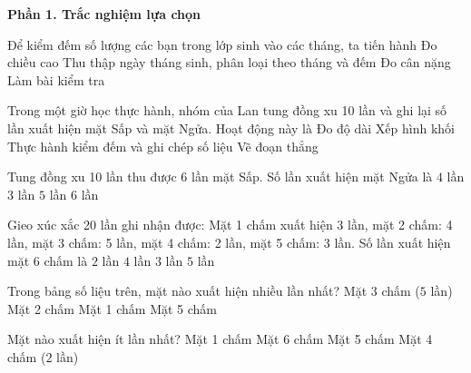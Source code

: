 \textbf{Phần 1. Trắc nghiệm lựa chọn}

\begin{ex} %
Để kiểm đếm số lượng các bạn trong lớp sinh vào các tháng, ta tiến hành
\choice
{Đo chiều cao}
{\True Thu thập ngày tháng sinh, phân loại theo tháng và đếm}
{Đo cân nặng}
{Làm bài kiểm tra}
\end{ex}

\begin{ex} %
Trong một giờ học thực hành, nhóm của Lan tung đồng xu 10 lần và ghi lại số lần xuất hiện mặt Sấp và mặt Ngửa. Hoạt động này là
\choice
{Đo độ dài}
{Xếp hình khối}
{\True Thực hành kiểm đếm và ghi chép số liệu}
{Vẽ đoạn thẳng}
\end{ex}

\begin{ex} %
Tung đồng xu 10 lần thu được 6 lần mặt Sấp. Số lần xuất hiện mặt Ngửa là
\choice
{\True $4$ lần}
{$3$ lần}
{$5$ lần}
{$6$ lần}
\end{ex}

\begin{ex} %
Gieo xúc xắc 20 lần ghi nhận được: Mặt 1 chấm xuất hiện 3 lần, mặt 2 chấm: 4 lần, mặt 3 chấm: 5 lần, mặt 4 chấm: 2 lần, mặt 5 chấm: 3 lần. Số lần xuất hiện mặt 6 chấm là
\choice
{$2$ lần}
{$4$ lần}
{\True $3$ lần}
{$5$ lần}
\end{ex}

\begin{ex} %
Trong bảng số liệu trên, mặt nào xuất hiện nhiều lần nhất?
\choice
{\True Mặt 3 chấm ($5$ lần)}
{Mặt 2 chấm}
{Mặt 1 chấm}
{Mặt 5 chấm}
\end{ex}

\begin{ex} %
Mặt nào xuất hiện ít lần nhất?
\choice
{Mặt 1 chấm}
{Mặt 6 chấm}
{Mặt 5 chấm}
{\True Mặt 4 chấm ($2$ lần)}
\end{ex}

